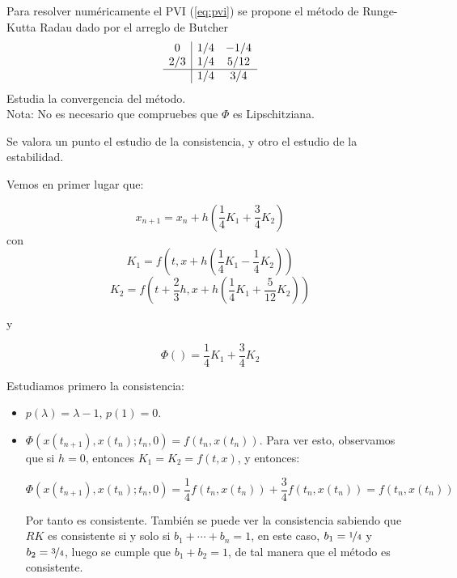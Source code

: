 \documentclass[12pt]{article}
\begin{document}
    \begin{ejercicio}[2 puntos]
      Para resolver numéricamente el PVI (\ref{eq:pvi}) se propone el método de Runge-Kutta Radau dado por el arreglo de Butcher
      \[
      \begin{array}{c|cc}
      0   & 1/4 & -1/4 \\
      2/3 & 1/4 & 5/12 \\
      \hline
            & 1/4 & 3/4
      \end{array}
      \]
      Estudia la convergencia del método. \\ 
      Nota: No es necesario que compruebes que $\Phi$ es Lipschitziana. \\ 

      \begin{observacion}
          Se valora un punto el estudio de la consistencia, y otro el estudio de la estabilidad. \\
      \end{observacion}

      Vemos en primer lugar que:

      $$x_{n+1} = x_n + h \left( \dfrac{1}{4} K_1 + \dfrac{3}{4} K_2 \right)$$
      con 
      $$K_1 = f \left(t, x + h \left( \dfrac{1}{4} K_1 - \dfrac{1}{4} K_2 \right) \right)$$
      $$K_2 = f \left(t + \dfrac{2}{3} h, x + h \left( \dfrac{1}{4} K_1 + \dfrac{5}{12} K_2 \right) \right)$$

      y 

      $$\Phi( ) = \dfrac{1}{4} K_1 + \dfrac{3}{4} K_2$$

      Estudiamos primero la consistencia:

      \begin{itemize}
        \item $p(\lambda) = \lambda - 1$, $p(1) = 0$.
        \item $\Phi(x(t_{n+1}), x(t_n); t_n, 0) = f(t_n, x(t_n))$. Para ver esto, observamos que si $h=0$, entonces $K_1 = K_2 = f(t,x)$, y entonces:
        
        $$\Phi(x(t_{n+1}), x(t_n); t_n, 0) = \dfrac{1}{4} f(t_n, x(t_n)) + \dfrac{3}{4} f(t_n, x(t_n)) = f(t_n, x(t_n))$$

        Por tanto es consistente. También se puede ver la consistencia sabiendo que $RK$ es consistente si y solo si $b_1 + \cdots + b_n = 1$, en este caso, $b_1 = \nicefrac{1}{4}$ y $b_2 = \nicefrac{3}{4}$, luego se cumple que $b_1 + b_2 = 1$, de tal
        manera que el método es consistente.
      \end{itemize}


\end{ejercicio}
\end{document}
